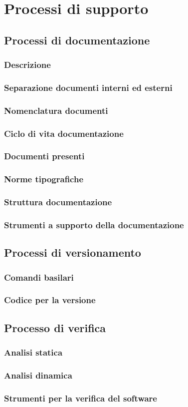 \documentclass[main.tex]{subfiles}
\begin{document}
\chapter{Processi di supporto}

\section{Processi di documentazione}
\subsection{Descrizione}
\subsection{Separazione documenti interni ed esterni}
\subsection{Nomenclatura documenti}
\subsection{Ciclo di vita documentazione}
\subsection{Documenti presenti}
\subsection{Norme tipografiche}
\subsection{Struttura documentazione}
\subsection{Strumenti a supporto della documentazione}

\section{Processi di versionamento}
\subsection{Comandi basilari}
\subsection{Codice per la versione}

\section{Processo di verifica}
\subsection{Analisi statica}
\subsection{Analisi dinamica}
\subsection{Strumenti per la verifica del software}
\end{document}
